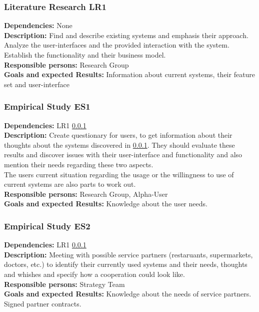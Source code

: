\documentclass[a4paper,11pt]{article}
\begin{document}
\subsubsection{Literature Research LR1}
\label{sect:workplan:phase1:lr1}
\textbf{Dependencies:} None\\
\textbf{Description:} Find and describe existing systems and emphasis their approach.
Analyze the user-interfaces and the provided interaction with the system. Establish the functionality and their business model.\\
\textbf{Responsible persons:} Research Group\\
\textbf{Goals and expected Results:} Information about current systems, their feature set and user-interface\\

\subsubsection{Empirical Study ES1}
\label{sect:workplan:phase1:es1}
\textbf{Dependencies:} LR1 \ref{sect:workplan:phase1:lr1}\\
\textbf{Description:} Create questionary for users, to get information about their thoughts about the systems discovered in \ref{sect:workplan:phase1:lr1}. They should evaluate these results and discover issues with their user-interface and functionality and also mention their needs regarding these two aspects.\\
The users current situation regarding the usage or the willingness to use of current systems are also parts to work out. \\
\textbf{Responsible persons:} Research Group, Alpha-User \\
\textbf{Goals and expected Results:} Knowledge about the user needs.\\

\subsubsection{Empirical Study ES2}
\label{sect:workplan:phase1:es2}
\textbf{Dependencies:} LR1 \ref{sect:workplan:phase1:lr1}\\
\textbf{Description:} Meeting with possible service partners (restaruants, supermarkets, doctors, etc.) to identify their currently used systems and their needs, thoughts and whishes and specify how a cooperation could look like.\\
\textbf{Responsible persons:} Strategy Team\\
\textbf{Goals and expected Results:} Knowledge about the needs of service partners. Signed partner contracts. \\
\end{document}
